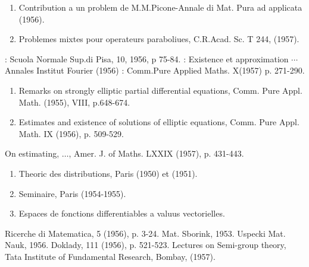 \begin{thebibliography}{99}
\begin{enumerate}
    \item Contribution a un problem de M.M.Picone-Annale di Mat. Pura
      ad applicata (1956).\label{k10:e6} 

    \item Problemes mixtes pour operateurs paraboliues,
      C.R.Acad. Sc. T 244, (1957).\label{k10:e7} 
  \end{enumerate}
 : Scuola Normale Sup.di Pisa, 10,
  1956, p 75-84. 
 : Existence et approximation $\cdots$
  Annales Institut Fourier (1956) 
 : Comm.Pure Applied
  Maths. X(1957) p. 271-290. 
  \begin{enumerate}
    \item Remarks on strongly elliptic partial
      differential equations, Comm. Pure Appl. Math. (1955), VIII,
      p.648-674.\label{k14:e1} 

    \item Estimates and existence of solutions of elliptic equations,
      Comm. Pure Appl. Math. IX (1956), p. 509-529.\label{k14:e2}
  \end{enumerate}
  On estimating, $\ldots$, Amer. J. of Maths. LXXIX
  (1957), p. 431-443. 
  \begin{enumerate}
    \item Theoric des distributions, Paris (1950) et (1951).\label{k16:e1}  

    \item Seminaire, Paris (1954-1955).\label{k16:e2}

    \item Espaces de fonctions differentiables a valuus
      vectorielles.\label{k16:e3} 
  \end{enumerate}
 Ricerche di Matematica, 5 (1956), p. 3-24.
 Mat. Sborink, 1953.
 Uspecki Mat. Nauk, 1956.
 Doklady, 111 (1956), p. 521-523.
 Lectures on Semi-group theory, Tata
  Institute of Fundamental Research, Bombay, (1957). 
\end{thebibliography}


